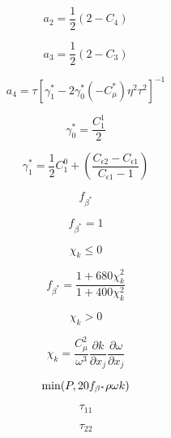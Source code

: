 \begin{equation}
a_2 = \frac{1}{2} \left( 2 - C_4 \right)
\end{equation}

\begin{equation}
a_3 = \frac{1}{2} \left( 2 - C_3 \right)
\end{equation}

\begin{equation}
a_4 = \tau \left[ \gamma_1^* - 2 \gamma_0^* \left( -C_{\mu}^* \right) \eta^2 \tau^2 \right]^{-1}
\end{equation}

\begin{equation}
\gamma_0^* = \frac{C_1^1}{2}
\end{equation}

\begin{equation}
\gamma_1^* = \frac{1}{2} C_1^0 + \left( \frac{C_{\epsilon 2} - C_{\epsilon 1}}{C_{\epsilon 1} - 1} \right)
\end{equation}

\begin{equation}
f_{\beta^*}
\end{equation}

\begin{equation}
f_{\beta^*} = 1 
\end{equation}

\begin{equation}
\chi_k \leq 0
\end{equation}

\begin{equation}
f_{\beta^*} = \frac{1 + 680 \chi_k^2}{1 + 400 \chi_k^2}
\end{equation}

\begin{equation}
\chi_k > 0
\end{equation}

\begin{equation}
\chi_k = \frac{C_{\mu}^2}{\omega^3} \frac{\partial k}{\partial x_j} \frac{\partial \omega}{\partial x_j}
\end{equation}

\begin{equation}
{\rm min}(P, 20 f_{\beta^*} \rho \omega k)
\end{equation}

\begin{equation}
\tau_{11}
\end{equation}

\begin{equation}
\tau_{22}
\end{equation}

